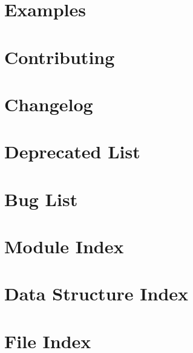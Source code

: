 \let\mypdfximage\pdfximage\def\pdfximage{\immediate\mypdfximage}\documentclass[twoside]{book}
\newcommand{\+}{\discretionary{\mbox{\scriptsize$\hookleftarrow$}}{}{}}
\begin{document}
\chapter{Examples}
\label{examples}

\chapter{Contributing}
\label{md_CONTRIBUTING}

\chapter{Changelog}
\label{md_CHANGELOG}

\chapter{Deprecated List}
\label{deprecated}

\chapter{Bug List}
\label{bug}

\chapter{Module Index}

\chapter{Data Structure Index}

\chapter{File Index}

\end{document}
